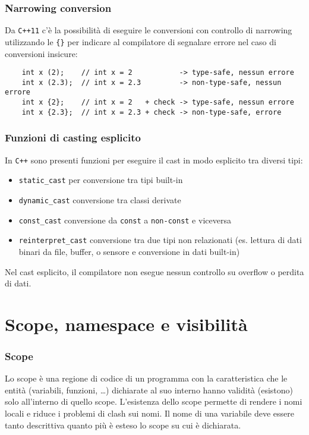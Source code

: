 \documentclass[a4paper]{article}
\begin{document}
\subsubsection*{Narrowing conversion}
Da \verb|C++11| c'è la possibilità di eseguire le conversioni con controllo di narrowing utilizzando le \verb|{}| per indicare al
compilatore di segnalare errore nel caso di conversioni insicure:
\begin{lstlisting}
	int x (2);    // int x = 2           -> type-safe, nessun errore
	int x (2.3);  // int x = 2.3         -> non-type-safe, nessun errore
	int x {2};    // int x = 2   + check -> type-safe, nessun errore
	int x {2.3};  // int x = 2.3 + check -> non-type-safe, errore
\end{lstlisting}

\subsubsection*{Funzioni di casting esplicito}
In \verb|C++| sono presenti funzioni per eseguire il cast in modo esplicito tra diversi tipi:
\begin{itemize}
	\item \verb|static_cast| per conversione tra tipi built-in
	\item \verb|dynamic_cast| conversione tra classi derivate
	\item \verb|const_cast| conversione da \verb|const| a \verb|non-const| e viceversa
	\item \verb|reinterpret_cast| conversione tra due tipi non relazionati (es. lettura di dati binari da file, buffer, o
	sensore e conversione in dati built-in)
\end{itemize}
Nel cast esplicito, il compilatore non esegue nessun controllo su overflow o perdita di dati.

\newpage

\section{Scope, namespace e visibilità}
\subsubsection*{Scope}
Lo scope è una regione di codice di un programma con la caratteristica che le entità (variabili, funzioni, \dots) dichiarate al
suo interno hanno validità (esistono) solo all'interno di quello scope. L'esistenza dello scope permette di rendere i nomi locali
e riduce i problemi di clash sui nomi. Il nome di una variabile deve essere tanto descrittiva quanto più è esteso lo scope su
cui è dichiarata.
\end{document}
